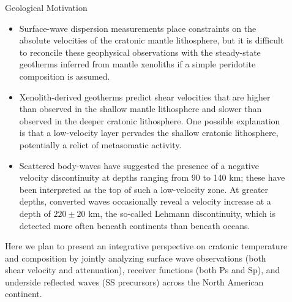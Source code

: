 \documentclass[final]{beamer}
\newlength{\sepwid}
\newlength{\onecolwid}
\newlength{\twocolwid}
\begin{document}
\begin{frame}[t]
\begin{columns}[t]
\begin{column}{\onecolwid}
\begin{block}{Geological Motivation}
\begin{itemize}
\item Surface-wave dispersion measurements place constraints on the absolute velocities of the cratonic mantle lithosphere, but it is difficult to reconcile these geophysical observations with the steady-state geotherms inferred from mantle xenoliths if a simple peridotite composition is assumed.
 
\item Xenolith-derived geotherms predict shear velocities that are higher than observed in the shallow mantle lithosphere and slower than observed in the deeper cratonic lithosphere.  One possible explanation is that a low-velocity layer pervades the shallow cratonic lithosphere, potentially a relict of metasomatic activity.

\item Scattered body-waves have suggested the presence of a negative velocity discontinuity at depths ranging from 90 to 140 km; these have been interpreted as the top of such a low-velocity zone.  At greater depths, converted waves occasionally reveal a velocity increase at a depth of $220\pm20$ km, the so-called Lehmann discontinuity, which is detected more often beneath continents than beneath oceans.

\end{itemize}

Here we plan to present an integrative perspective on cratonic temperature and composition by jointly analyzing surface wave observations (both shear velocity and attenuation), receiver functions (both Ps and Sp), and underside reflected waves (SS precursors) across the North American continent.

\end{block}




\end{column} %

\begin{column}{\sepwid}\end{column} %

\begin{column}{\twocolwid} %


\end{column}
\end{columns}
\end{frame}
\end{document}
